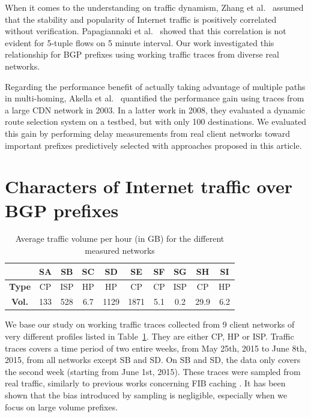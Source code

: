 When it comes to the understanding on traffic dynamism, Zhang et al.\ \cite{Zhang2012} assumed that the stability and popularity of Internet traffic is positively correlated without verification. 
Papagiannaki et al.\ \cite{Papagiannaki2004} showed that this correlation is not evident for 5-tuple flows on 5 minute interval. 
Our work investigated this relationship for BGP prefixes using working traffic traces from diverse real networks.

Regarding the performance benefit of actually taking advantage of multiple paths in multi-homing, Akella et al.\ \cite{Akella2003a} quantified the performance gain using traces from a large CDN network in 2003.
In a latter work \cite{Akella2008} in 2008, they evaluated a dynamic route selection system on a testbed, but with only 100 destinations. 
We evaluated this gain by performing delay measurements from real client networks toward important prefixes predictively selected with approaches proposed in this article.

\section{Characters of Internet traffic over BGP prefixes}
\label{sec:chp2_chara}
\begin{table}[!tb]
\centering
\footnotesize
\setlength{\tabcolsep}{0.5em}
\begin{tabular}{cccccccccc}
\toprule
 & \textbf{SA} & \textbf{SB} & \textbf{SC} & \textbf{SD} & \textbf{SE} & \textbf{SF} & \textbf{SG} & \textbf{SH} & \textbf{SI} \\
\midrule
\textbf{Type} & CP & ISP & HP & HP & CP & CP & ISP & CP & HP \\
\textbf{Vol.} & 133 & 528 & 6.7 & 1129 & 1871 & 5.1 & 0.2 & 29.9 & 6.2 \\
\bottomrule
\end{tabular}
\caption{Average traffic volume per hour (in GB) for the different measured networks}
\label{tab:network_type}
\end{table}

We base our study on working traffic traces collected from 9 client networks of very different profiles listed in Table~\ref{tab:network_type}. 
They are either \ac{CP}, \ac{HP} or \ac{ISP}. 
Traffic traces covers a time period of two entire weeks, from May 25th, 2015 to June 8th, 2015, from all networks except SB and SD.
On SB and SD, the data only covers the second week (starting from June 1st, 2015).
These traces were sampled from real traffic, similarly to previous works concerning FIB caching \cite{Kim2009, Zhang2012}.
It has been shown that the bias introduced by sampling is negligible, especially when we focus on large volume prefixes.

